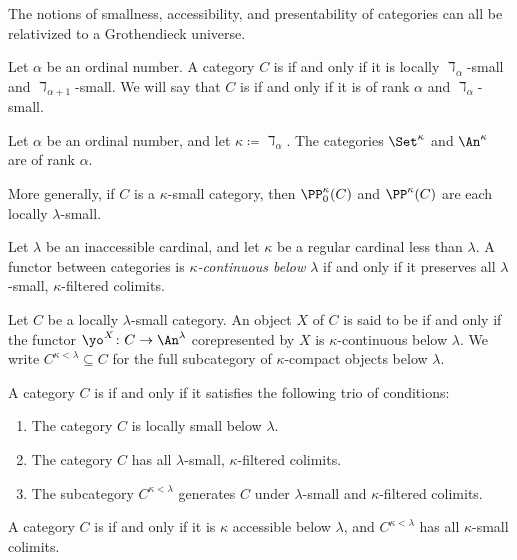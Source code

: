 The notions of smallness,
accessibility, and presentability of categories
can all be relativized to a Grothendieck universe.

\begin{definition}
	Let $ \alpha $ be an ordinal number.
	A category $ C $ is
	 if and only if
	it is locally $ \daleth_{\alpha} $-small
	and $ \daleth_{\alpha + 1} $-small.
	We will say that $ C $ is
	if and only if it is of rank $ \alpha $
	and $ \daleth_{\alpha} $-small.
\end{definition}

\begin{eg}
	Let $ \alpha $ be an ordinal number, and
	let $ \kappa \coloneq \daleth_{\alpha} $.
	The categories $ \Set^{\kappa} $
	and $ \An^{\kappa} $
	are of rank $ \alpha $.
	
	More generally, if $ C $ is a $ \kappa $-small category,
	then $ \PP_0^{\kappa}(C) $ and $ \PP^{\kappa}(C) $
	are each locally $ \lambda $-small.
\end{eg}

\begin{definition}
	Let $ \lambda $ be an inaccessible cardinal, and 
	let $ \kappa $ be a regular cardinal less than $ \lambda $.
	A functor between categories is
	\emph{$ \kappa $-continuous below  $ \lambda $} if and only if 
	it preserves all $ \lambda $-small, $ \kappa $-filtered colimits.
	
	Let $ C $ be a locally $ \lambda $-small category.
	An object $ X $ of $ C $
	is said to be  if and only if
	the functor $ \yo^X \colon C \to \An^{\lambda} $ corepresented by $ X $
	is $ \kappa $-continuous below $ \lambda $.
	We write $ C^{\kappa < \lambda} \subseteq C $
	for the full subcategory of $ \kappa $-compact objects below $ \lambda $.

	A category $C$ is
	 if and only if
	it satisfies the following trio of conditions:
	\begin{enumerate}
		\item The category $ C $ is locally small below $ \lambda $.
		\item The category $ C $ has all $ \lambda $-small, $ \kappa $-filtered colimits.
		\item The subcategory $ C^{\kappa < \lambda} $
			generates $ C $ under $ \lambda $-small and 
			$ \kappa $-filtered colimits.
	\end{enumerate}
	
	A category $C$ is
	if and only if
	it is $ \kappa $ accessible below $ \lambda $, and  
	$ C^{\kappa < \lambda} $ has all $ \kappa $-small colimits.
\end{definition}


